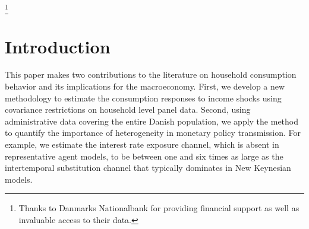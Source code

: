 \documentclass[titlepage]{\econtex}\newcommand{\texname}{ConsumptionHeterogeneity}
\begin{document}
\begin{authorsinfo}
\end{authorsinfo}
\thanks{Thanks to Danmarks Nationalbank for providing financial support as well as invaluable access to their data.}

\titlepagefinish
\setcounter{page}{1}

\pagebreak
\section{Introduction}
This paper makes two contributions to the literature on household consumption behavior and its implications for the macroeconomy. First, we develop a new methodology to estimate the consumption responses to income shocks using covariance restrictions on household level panel data. Second, using administrative data covering the entire Danish population, we apply the method to quantify the importance of heterogeneity in monetary policy transmission. For example, we estimate the interest rate exposure channel, which is absent in representative agent models, to be between one and six times as large as the intertemporal substitution channel that typically dominates in New Keynesian models.
\end{document}
